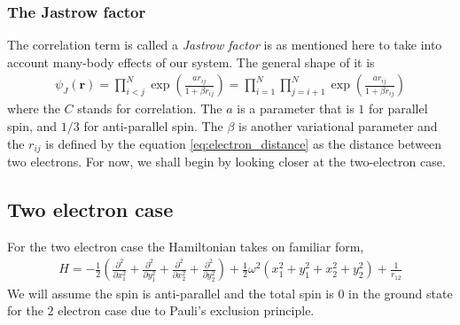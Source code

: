 \documentclass[11pt]{article}
\begin{document}
\subsubsection{The Jastrow factor}
The correlation term is called a \textit{Jastrow factor} is as mentioned here to take into account many-body effects of our system. The general shape of it is
\begin{align}
	\psi_J(\mathbf{r}) = \prod_{i<j}^N \exp{\left(\frac{ar_{ij}}{1 + \beta r_{ij}}\right)} = \prod_{i=1}^N \prod_{j=i+1}^N \exp{\left(\frac{ar_{ij}}{1 + \beta r_{ij}}\right)}
	\label{eq:WF_jastrow}
\end{align}
where the $C$ stands for correlation. The $a$ is a parameter that is $1$ for parallel spin, and $1/3$ for anti-parallel spin. The $\beta$ is another variational parameter and the $r_{ij}$ is defined by the equation \eqref{eq:electron_distance} as the distance between two electrons. For now, we shall begin by looking closer at the two-electron case.




\subsection{Two electron case}
For the two electron case the Hamiltonian takes on familiar form,
\begin{align}
	H = -\frac{1}{2}\left(\frac{\partial^2}{\partial x^2_1} + \frac{\partial^2}{\partial y^2_1} + \frac{\partial^2}{\partial x^2_2} + \frac{\partial^2}{\partial y^2_2}\right) + \frac{1}{2}\omega^2(x^2_1 + y^2_1 + x^2_2 + y^2_2) + \frac{1}{r_{12}}
	\label{eq:hamiltonian_two_electron}
\end{align}
We will assume the spin is anti-parallel and the total spin is $0$ in the ground state for the $2$ electron case due to Pauli's exclusion principle.
\end{document}
